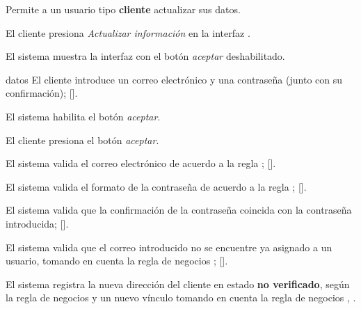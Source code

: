 %
%

{
  Permite a un usuario tipo \textbf{cliente} actualizar sus datos.

  \begin{trayectoriaPrincipal}

    \item El cliente presiona \textit{Actualizar información} en la
      interfaz .

    \item El sistema muestra la interfaz
       con el botón \textit{aceptar}
      deshabilitado.

    \item[datos] El cliente introduce un correo electrónico y una contraseña
      (junto con su confirmación); [].

    \item El sistema habilita el botón \textit{aceptar}.

    \item El cliente presiona el botón \textit{aceptar}.

    \item El sistema valida el correo electrónico de acuerdo a la regla
      ;
      [].

    \item El sistema valida el formato de la contraseña de acuerdo a la regla
      ;
      [].

    \item El sistema valida que la confirmación de la contraseña coincida con
      la contraseña introducida;
      [].

    \item El sistema valida que el correo introducido no se encuentre ya
      asignado a un usuario, tomando en cuenta la regla de negocios
      ;
      [].

      \item El sistema registra la nueva dirección del cliente en estado
        \textbf{no verificado}, según la regla de negocios
         y un nuevo vínculo tomando en cuenta
        la regla de negocios
        , .


\end{trayectoriaPrincipal}}
